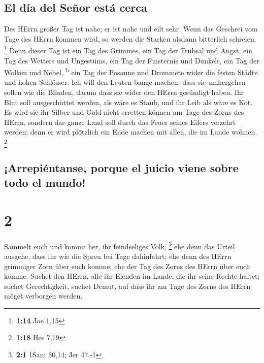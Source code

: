 \hypertarget{el-duxeda-del-seuxf1or-estuxe1-cerca}{%
\subsection{El día del Señor está
cerca}\label{el-duxeda-del-seuxf1or-estuxe1-cerca}}

 Des HErrn großer Tag ist nahe; er ist nahe und eilt
sehr. Wenn das Geschrei vom Tage des HErrn kommen wird, so werden die
Starken alsdann bitterlich schreien. \footnote{\textbf{1:14} Joe 1,15}
 Denn dieser Tag ist ein Tag des Grimmes, ein Tag der
Trübsal und Angst, ein Tag des Wetters und Ungestüms, ein Tag der
Finsternis und Dunkels, ein Tag der Wolken und Nebel,
\textsuperscript{b}  ein Tag der Posaune und Drommete
wider die festen Städte und hohen Schlösser.  Ich will
den Leuten bange machen, dass sie umhergehen sollen wie die Blinden,
darum dass sie wider den HErrn gesündigt haben. Ihr Blut soll
ausgeschüttet werden, als wäre es Staub, und ihr Leib als wäre es Kot.
 Es wird sie ihr Silber und Gold nicht erretten können am
Tage des Zorns des HErrn, sondern das ganze Land soll durch das Feuer
seines Eifers verzehrt werden; denn er wird plötzlich ein Ende machen
mit allen, die im Lande wohnen. \footnote{\textbf{1:18} Hes 7,19}

\hypertarget{arrepiuxe9ntanse-porque-el-juicio-viene-sobre-todo-el-mundo}{%
\subsection{¡Arrepiéntanse, porque el juicio viene sobre todo el
mundo!}\label{arrepiuxe9ntanse-porque-el-juicio-viene-sobre-todo-el-mundo}}

\hypertarget{section-1}{%
\section{2}\label{section-1}}

 Sammelt euch und kommt her, ihr feindseliges Volk,
\footnote{\textbf{2:1} 1Sam 30,14; Jer 47,-1}  ehe denn
das Urteil ausgehe, dass ihr wie die Spreu bei Tage dahinfahrt; ehe denn
des HErrn grimmiger Zorn über euch komme; ehe der Tag des Zorns des
HErrn über euch komme.  Suchet den HErrn, alle ihr Elenden
im Lande, die ihr seine Rechte haltet; suchet Gerechtigkeit, suchet
Demut, auf dass ihr am Tage des Zorns des HErrn möget verborgen werden.

